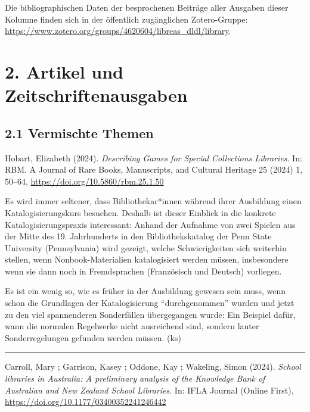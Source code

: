 \documentclass[a4paper,
fontsize=11pt,
oneside,
numbers=noperiodatend,
parskip=half-,
bibliography=totoc,
final
]{scrartcl}
\begin{document}
Die bibliographischen Daten der besprochenen Beiträge aller Ausgaben
dieser Kolumne finden sich in der öffentlich zugänglichen Zotero-Gruppe:
\url{https://www.zotero.org/groups/4620604/libreas_dldl/library}.

\hypertarget{artikel-und-zeitschriftenausgaben}{%
\section{2. Artikel und
Zeitschriftenausgaben}\label{artikel-und-zeitschriftenausgaben}}

\hypertarget{vermischte-themen}{%
\subsection{2.1 Vermischte Themen}\label{vermischte-themen}}

Hobart, Elizabeth (2024). \emph{Describing Games for Special Collections
Libraries}. In: RBM. A Journal of Rare Books, Manuscripts, and Cultural
Heritage 25 (2024) 1, 50--64, \url{https://doi.org/10.5860/rbm.25.1.50}

Es wird immer seltener, dass Bibliothekar*innen während ihrer Ausbildung
einen Katalogisierungskurs besuchen. Deshalb ist dieser Einblick in die
konkrete Katalogisierungspraxis interessant: Anhand der Aufnahme von
zwei Spielen aus der Mitte des 19. Jahrhunderts in den
Bibliothekskatalog der Penn State University (Pennsylvania) wird
gezeigt, welche Schwierigkeiten sich weiterhin stellen, wenn
Nonbook-Materialien katalogisiert werden müssen, insbesondere wenn sie
dann noch in Fremdsprachen (Französisch und Deutsch) vorliegen.

Es ist ein wenig so, wie es früher in der Ausbildung gewesen sein muss,
wenn schon die Grundlagen der Katalogisierung \enquote{durchgenommen}
wurden und jetzt zu den viel spannenderen Sonderfällen übergegangen
wurde: Ein Beispiel dafür, wann die normalen Regelwerke nicht
ausreichend sind, sondern lauter Sonderregelungen gefunden werden
müssen. (ks)

\begin{center}\rule{0.5\linewidth}{0.5pt}\end{center}

Carroll, Mary ; Garrison, Kasey ; Oddone, Kay ; Wakeling, Simon (2024).
\emph{School libraries in Australia: A preliminary analysis of the
Knowledge Bank of Australian and New Zealand School Libraries}. In: IFLA
Journal (Online First), \url{https://doi.org/10.1177/03400352241246442}
\end{document}
